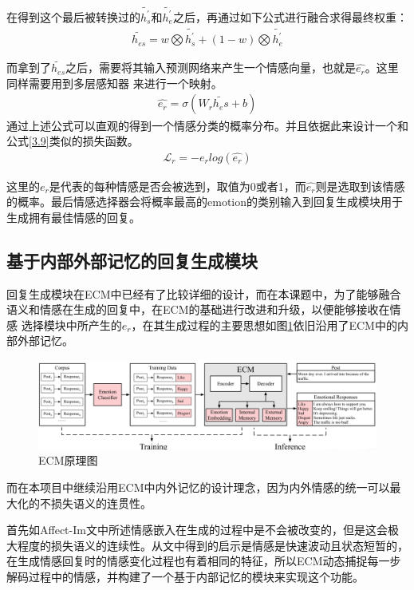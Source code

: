 \documentclass[supercite]{HustGraduPaper}
\theoremstyle{definition}
\begin{document}
在得到这个最后被转换过的$\widetilde{h_s^{'}}$和$\widetilde{h_e^{'}}$之后，再通过如下公式进行融合求得最终权重：
\begin{align}
  {\widetilde{h_{es}}} = w \bigotimes {\widetilde{h_s^{'}}} + (1 - w) \bigotimes {\widetilde{h_e^{'}}} \label{3.13}
\end{align}

而拿到了$\widetilde{h_{es}}$之后，需要将其输入预测网络来产生一个情感向量，也就是$\hat{e_r}$。这里同样需要用到多层感知器
来进行一个映射。
\begin{align}
  \hat{e_r} = \sigma(W_r \widetilde{h_es} + b) \label{3.14}
\end{align}
通过上述公式可以直观的得到一个情感分类的概率分布。并且依据此来设计一个和公式\ref{3.9}类似的损失函数。
\begin{align}
  \mathcal{L}_r = -e_r log(\hat{e_r}) \label{3.15} 
\end{align}

这里的$e_r$是代表的每种情感是否会被选到，取值为0或者1，而$\hat{e_r}$则是选取到该情感的概率。最后情感选择器会将概率最高的emotion的类别输入到回复生成模块用于生成拥有最佳情感的回复。

\subsection{基于内部外部记忆的回复生成模块}
回复生成模块在ECM\cite{DBLP:journals/corr/ZhouHZZL17}中已经有了比较详细的设计，而在本课题中，为了能够融合语义和情感在生成的回复中，在ECM的基础进行改进和升级，以便能够接收在情感
选择模块中所产生的$e_r$，在其生成过程的主要思想如图\ref{Fig.ECM}依旧沿用了ECM中的内部外部记忆。
\begin{figure}[htbp] %
  \centering %
  \includegraphics[width=1\textwidth]{images/ECM.png} %
  \caption{ECM原理图} %
  \label{Fig.ECM} %
\end{figure}
而在本项目中继续沿用ECM中内外记忆的设计理念，因为内外情感的统一可以最大化的不损失语义的连贯性。

首先如Affect-Im\cite{ghosh2017affect}文中所述情感嵌入在生成的过程中是不会被改变的，但是这会极大程度的损失语义的连续性。从文中得到的启示是情感是快速波动且状态短暂的，
在生成情感回复时的情感变化过程也有着相同的特征，所以ECM动态捕捉每一步解码过程中的情感，并构建了一个基于内部记忆的模块来实现这个功能。
\end{document}
